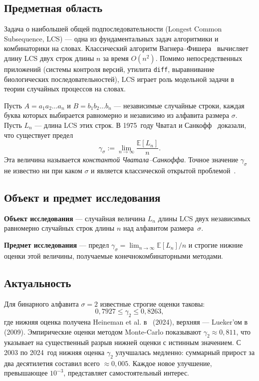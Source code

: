 \subsection*{Предметная область}

Задача о наибольшей общей подпоследовательности (Longest Common Subsequence, LCS) --- одна из фундаментальных задач алгоритмики и комбинаторики на словах. Классический алгоритм Вагнера--Фишера~\cite{wagner1974} вычисляет длину LCS двух строк длины $n$ за время $O(n^2)$. Помимо непосредственных приложений (системы контроля версий, утилита \texttt{diff}, выравнивание биологических последовательностей), LCS играет роль модельной задачи в теории случайных процессов на словах.

Пусть $A = a_1 a_2 \ldots a_n$ и $B = b_1 b_2 \ldots b_n$ --- независимые случайные строки, каждая буква которых выбирается равномерно и независимо из алфавита размера $\sigma$. Пусть $L_n$ --- длина LCS этих строк. В 1975~году Чватал и Санкофф~\cite{chvatal1975} доказали, что существует предел
\[
    \gamma_\sigma := \lim_{n \to \infty} \frac{\mathbb{E}[L_n]}{n}.
\]
Эта величина называется \emph{константой Чватала--Санкоффа}. Точное значение $\gamma_\sigma$ не известно ни при каком $\sigma$ и является классической открытой проблемой~\cite{lueker2009, heineman2024}.

\subsection*{Объект и предмет исследования}

\textbf{Объект исследования} --- случайная величина $L_n$ длины LCS двух независимых равномерно случайных строк длины $n$ над алфавитом размера~$\sigma$.

\textbf{Предмет исследования} --- предел $\gamma_\sigma = \lim_{n \to \infty} \mathbb{E}[L_n]/n$ и строгие нижние оценки этой величины, получаемые конечно\-комбинаторными методами.

\subsection*{Актуальность}

Для бинарного алфавита $\sigma = 2$ известные строгие оценки таковы:
\[
    0{,}7927 \leq \gamma_2 \leq 0{,}8263,
\]
где нижняя оценка получена Heineman et al. в~\cite{heineman2024} (2024), верхняя --- Lueker'ом в~\cite{lueker2009} (2009). Эмпирические оценки методом Monte-Carlo показывают $\gamma_2 \approx 0{,}811$, что указывает на существенный разрыв нижней оценки с истинным значением. С 2003 по 2024~год нижняя оценка $\gamma_2$ улучшалась медленно: суммарный прирост за два десятилетия составил всего $\approx 0{,}005$. Каждое новое улучшение, превышающее $10^{-3}$, представляет самостоятельный интерес.

